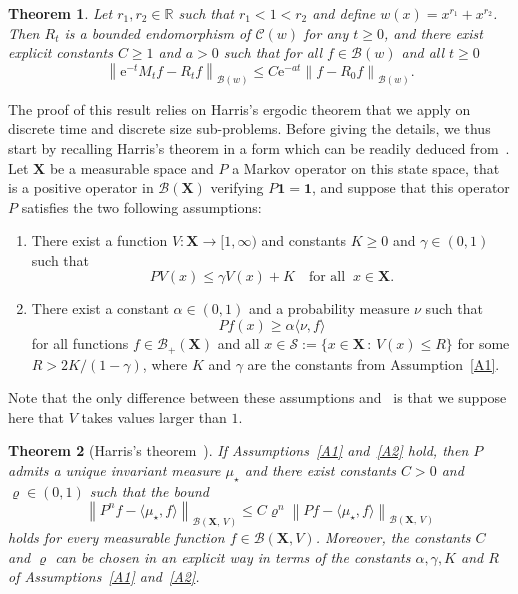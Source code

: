 \documentclass[10pt]{amsart}
\newtheorem{theo}{Theorem}[section]
\theoremstyle{definition}\newtheorem{defi}[theo]{Definition}\newtheorem{rema}[theo]{Remark}\newtheorem{exam}[theo]{Example}\newtheorem{exem}[theo]{Example}\newtheorem{nota}[theo]{Notation}
\renewcommand{\leq}{\leqslant}
\renewcommand{\geq}{\geqslant}
\newcommand{\Cr}{\mathcal{C}}
\newcommand{\B}{\mathcal{B}}
\newcommand{\Scal}{\mathcal{S}}
\newcommand{\R}{\mathbb{R}}
\newcommand{\1}{\mathds{1}}
\newcommand{\X}{\mathbf{X}}
\newcommand{\bfun}{\mathbf{1}}
\newcommand{\e}{\mathrm{e}}
\newcommand*{\Aenumi}{\renewcommand*{\theenumi}{A\arabic{enumi}}}
\begin{document}
\begin{theo}\label{thm:conv_norm}
Let $r_1,r_2\in\R$ such that $r_1<1<r_2$ and define $w(x)=x^{r_1}+x^{r_2}$. Then $R_t$ is a bounded endomorphism of $\Cr(w)$ for any $t\geq0$, and there exist explicit constants $C\geq1$ and $a>0$ such that for all $f\in\B(w)$ and all $t\geq0$
\[
\left\|\e^{-t}M_tf-R_tf\right\|_{\B(w)}\leq C\e^{-at}\left\|f-R_0f\right\|_{\B(w)}.
\]
\end{theo}

The proof of this result relies on Harris's ergodic theorem that we apply on discrete time and discrete size sub-problems. Before giving the details, we thus start by recalling Harris's theorem in a form which can be readily deduced from~\cite[Theorem~1.3]{HairerMattingly}. Let $\X$ be a measurable space and $P$ a Markov operator on this state space, that is a positive operator in $\B(\X)$ verifying $P\bfun=\bfun$, and suppose that this operator $P$ satisfies the two following assumptions:
\begin{enumerate}\Aenumi
\item\label{A1} There exist a function $V:\X\to[1,\infty)$ and constants $K\geq0$ and $\gamma\in(0,1)$ such that
\[
PV(x)\leq\gamma V(x)+K \quad\text{for all}\;\;x\in\X.
\]
\item\label{A2} There exist a constant $\alpha\in(0,1)$ and a probability measure $\nu$ such that
\[
Pf(x)\geq \alpha\langle\nu,f\rangle
\]
for all functions $f\in\B_+(\X)$ and all $x\in\Scal :=\{x\in\X\,:\,V(x)\leq R\}$ for some $R>2K/(1-\gamma)$, where $K$ and $\gamma$ are the constants from Assumption~\eqref{A1}.
\end{enumerate}
Note that the only difference between these assumptions and~\cite[Assumption~1 and Assumption~2]{HairerMattingly} is that we suppose here that $V$ takes values larger than $1$.

\begin{theo}[{Harris's theorem~\cite{HairerMattingly}}]\label{thm:HM}
If Assumptions~\eqref{A1} and~\eqref{A2} hold, then $P$ admits a unique invariant measure $\mu_\star$ and there exist constants $C>0$ and $\varrho\in(0,1)$ such that the bound
\[
\left\| P^nf-\langle\mu_\star,f\rangle\right\|_{\B(\X,\,V)}\leq C\varrho^n\left\| P f-\langle\mu_\star,f\rangle\right\|_{\B(\X,\,V)}
\]
holds for every measurable function $f\in\B(\X,V)$. Moreover, the constants $C$ and $\varrho$ can be chosen in an explicit way in terms of the constants $\alpha,\gamma,K$ and $R$ of Assumptions~\eqref{A1} and~\eqref{A2}.
\end{theo}
\end{document}
